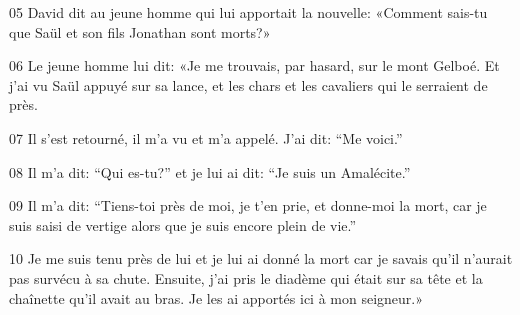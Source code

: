 05 David dit au jeune homme qui lui apportait la nouvelle: «Comment sais-tu que Saül et son fils Jonathan sont morts?»

06 Le jeune homme lui dit: «Je me trouvais, par hasard, sur le mont Gelboé. Et j’ai vu Saül appuyé sur sa lance, et les chars et les cavaliers qui le serraient de près.

07 Il s’est retourné, il m’a vu et m’a appelé. J’ai dit: “Me voici.”

08 Il m’a dit: “Qui es-tu?” et je lui ai dit: “Je suis un Amalécite.”

09 Il m’a dit: “Tiens-toi près de moi, je t’en prie, et donne-moi la mort, car je suis saisi de vertige alors que je suis encore plein de vie.”

10 Je me suis tenu près de lui et je lui ai donné la mort car je savais qu’il n’aurait pas survécu à sa chute. Ensuite, j’ai pris le diadème qui était sur sa tête et la chaînette qu’il avait au bras. Je les ai apportés ici à mon seigneur.»
